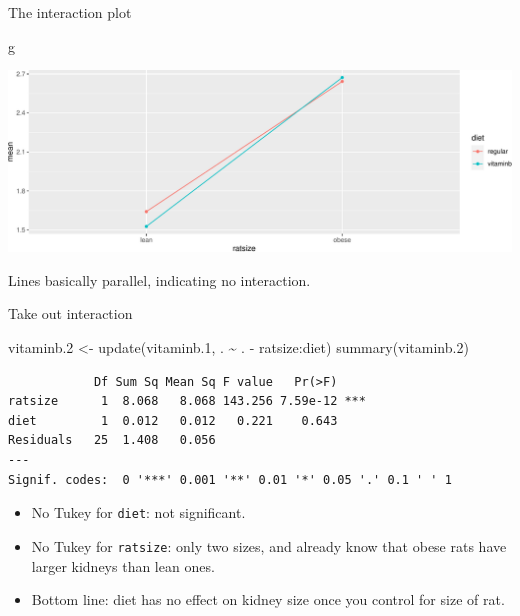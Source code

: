 \documentclass[
  ignorenonframetext,
]{beamer}
\newenvironment{Shaded}{\begin{snugshade}}{\end{snugshade}}
\newcommand{\FloatTok}[1]{\textcolor[rgb]{0.68,0.00,0.00}{#1}}
\newcommand{\FunctionTok}[1]{\textcolor[rgb]{0.28,0.35,0.67}{#1}}
\newcommand{\NormalTok}[1]{\textcolor[rgb]{0.00,0.23,0.31}{#1}}
\newcommand{\OtherTok}[1]{\textcolor[rgb]{0.00,0.23,0.31}{#1}}
\newcommand{\SpecialCharTok}[1]{\textcolor[rgb]{0.37,0.37,0.37}{#1}}
\begin{document}
\begin{frame}[fragile]{The interaction plot}
\protect\hypertarget{the-interaction-plot}{}
\begin{Shaded}
\begin{Highlighting}[]
\NormalTok{g}
\end{Highlighting}
\end{Shaded}

\includegraphics{anova_files/figure-beamer/bAnova-14-1.pdf}

Lines basically parallel, indicating no interaction.
\end{frame}

\begin{frame}[fragile]{Take out interaction}
\protect\hypertarget{take-out-interaction}{}
\small

\begin{Shaded}
\begin{Highlighting}[]
\NormalTok{vitaminb}\FloatTok{.2} \OtherTok{\textless{}{-}} \FunctionTok{update}\NormalTok{(vitaminb}\FloatTok{.1}\NormalTok{, . }\SpecialCharTok{\textasciitilde{}}\NormalTok{ . }\SpecialCharTok{{-}}\NormalTok{ ratsize}\SpecialCharTok{:}\NormalTok{diet)}
\FunctionTok{summary}\NormalTok{(vitaminb}\FloatTok{.2}\NormalTok{)}
\end{Highlighting}
\end{Shaded}

\begin{verbatim}
            Df Sum Sq Mean Sq F value   Pr(>F)    
ratsize      1  8.068   8.068 143.256 7.59e-12 ***
diet         1  0.012   0.012   0.221    0.643    
Residuals   25  1.408   0.056                     
---
Signif. codes:  0 '***' 0.001 '**' 0.01 '*' 0.05 '.' 0.1 ' ' 1
\end{verbatim}

\normalsize

\begin{itemize}
\item
  No Tukey for \texttt{diet}: not significant.
\item
  No Tukey for \texttt{ratsize}: only two sizes, and already know that
  obese rats have larger kidneys than lean ones.
\item
  Bottom line: diet has no effect on kidney size once you control for
  size of rat.
\end{itemize}
\end{frame}
\end{document}
